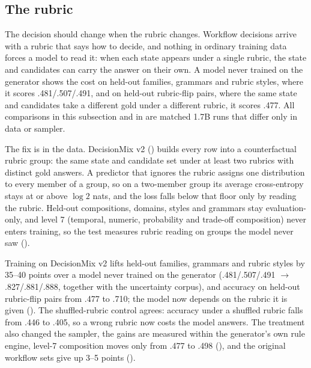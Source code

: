 \subsection{The rubric}
\label{sec:results:mixture}

The decision should change when the rubric changes. Workflow decisions arrive with a rubric that says how
to decide, and nothing in ordinary training data forces a model to read it: when each state appears under a
single rubric, the state and candidates can carry the answer on their own. A model never trained on the
generator shows the cost on held-out families, grammars and rubric styles, where it scores
.481/.507/.491, and on held-out rubric-flip pairs, where the same state and candidates take a different
gold under a different rubric, it scores .477. All comparisons in this subsection and in
 are matched 1.7B runs that differ only in data or sampler.

The fix is in the data. DecisionMix v2 () builds every row into a counterfactual
rubric group: the same state and candidate set under at least two rubrics with distinct gold answers. A
predictor that ignores the rubric assigns one distribution to every member of a group, so on a
two-member group its average cross-entropy stays at or above $\log 2$ nats, and the loss falls below
that floor only by reading the rubric. Held-out compositions,
domains, styles and grammars stay evaluation-only, and level 7 (temporal, numeric, probability and
trade-off composition) never enters training, so the test measures rubric reading on groups the model
never saw ().

Training on DecisionMix v2 lifts held-out families, grammars and rubric styles by 35--40 points over a
model never trained on the generator (.481/.507/.491 $\to$ .827/.881/.888, together with the uncertainty
corpus), and accuracy on held-out rubric-flip pairs from .477 to .710; the model now depends on the
rubric it is given (). The shuffled-rubric control agrees: accuracy under a
shuffled rubric falls from .446 to .405, so a wrong rubric now costs the model answers. The treatment
also changed the sampler, the gains are measured within the generator's own rule engine, level-7
composition moves only from .477 to .498 (), and the original workflow sets give
up 3--5 points ().
